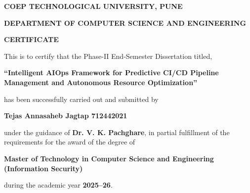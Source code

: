 
\thispagestyle{empty}

{
    \linespread{1.5}\selectfont

    \begin{center}
        \LARGE\bf COEP TECHNOLOGICAL UNIVERSITY, PUNE
    \end{center}

    \begin{center}
        \large\bf DEPARTMENT OF COMPUTER SCIENCE AND ENGINEERING
    \end{center}

    \vspace{20pt}

    \begin{center}
        \Large\bf CERTIFICATE
    \end{center}

    \vspace{20pt}

    \large
    This is to certify that the Phase-II End-Semester Dissertation titled,

    \begin{center}
        \Large\bf ``Intelligent AIOps Framework for Predictive CI/CD Pipeline Management and Autonomous Resource Optimization''
    \end{center}

    has been successfully carried out and submitted by

    \begin{center}
        \Large\bf Tejas Annasaheb Jagtap \hspace{1cm} 712442021
    \end{center}

    \noindent under the guidance of \textbf{Dr. V. K. Pachghare}, in partial fulfillment of the requirements for the award of the degree of

    \begin{center}
        \textbf{Master of Technology in Computer Science and Engineering (Information Security)}
    \end{center}

    during the academic year \textbf{2025--26}.

    \vspace{130pt}

}
